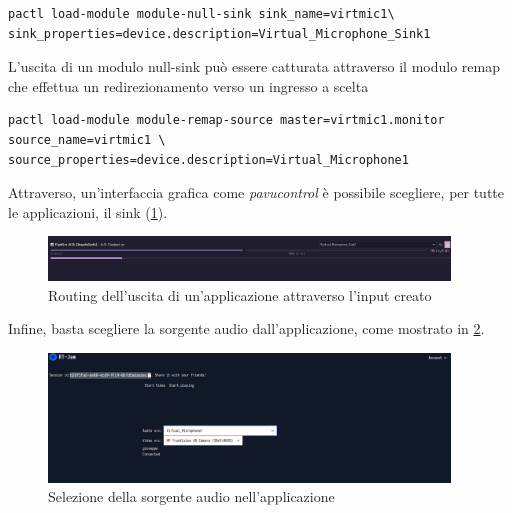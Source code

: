 \documentclass{article}
\begin{document}
\begin{verbatim}
pactl load-module module-null-sink sink_name=virtmic1\ 
sink_properties=device.description=Virtual_Microphone_Sink1
\end{verbatim}

L'uscita di un modulo null-sink può essere catturata attraverso il modulo remap che effettua un redirezionamento verso un ingresso a scelta
\begin{verbatim}
pactl load-module module-remap-source master=virtmic1.monitor source_name=virtmic1 \ 
source_properties=device.description=Virtual_Microphone1
\end{verbatim}

Attraverso, un'interfaccia grafica come \textit{pavucontrol} è possibile scegliere, per 
tutte le applicazioni, il sink (\cref{fig:routing-sink}).
\begin{figure}[h]
  \begin{center}
    \includegraphics[width=0.95\textwidth]{../figures/selecting_sink.png}
  \end{center}
  \caption{Routing dell'uscita di un'applicazione attraverso l'input creato}\label{fig:routing-sink}
\end{figure}

Infine, basta scegliere la sorgente audio dall'applicazione, come mostrato in \cref{fig:selecting-vmic}.

\begin{figure}
  \begin{center}
    \includegraphics[width=0.95\textwidth]{../figures/selecting_vmic.png}
  \end{center}
  \caption{Selezione della sorgente audio nell'applicazione}\label{fig:selecting-vmic}
\end{figure}
\end{document}
